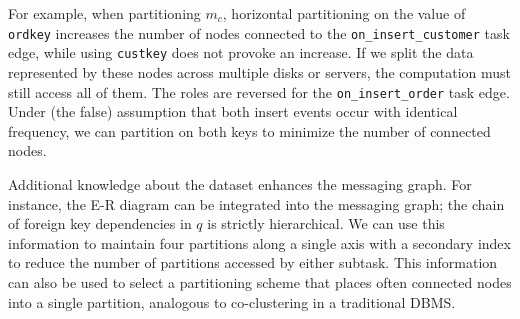 For example, when partitioning $m_c$, horizontal partitioning on the value of \texttt{ordkey} increases the number of nodes connected to the \texttt{on\_insert\_customer} task edge, while using \texttt{custkey} does not provoke an increase.  If we split the data represented by these nodes across multiple disks or servers, the computation must still access all of them.  The roles are reversed for the \texttt{on\_insert\_order} task edge.  Under (the false) assumption that both insert events occur with identical frequency, we can partition on both keys to minimize the number of connected nodes.

Additional knowledge about the dataset enhances the messaging graph.  For instance, the E-R diagram can be integrated into the messaging graph; the chain of foreign key dependencies in $q$ is strictly hierarchical.  We can use this information to maintain four partitions along a single axis with a secondary index to reduce the number of partitions accessed by either subtask.  This information can also be used to select a partitioning scheme that places often connected nodes into a single partition, analogous to co-clustering in a traditional DBMS.
